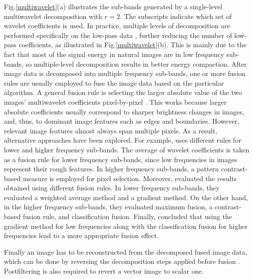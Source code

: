\documentclass{article}
\begin{document}
Fig.\ref{multiwavelet}(a) illustrates the sub-bands generated by a single-level multiwavelet decomposition with $r = 2$. The subscripts indicate which set of wavelet coefficients is used. In practice, multiple levels of decomposition are performed specifically on the low-pass data \cite{Wang2004, Liu2010}, further reducing the number of low-pass coefficients, as illustrated in Fig.\ref{multiwavelet}(b). This is mainly due to the fact that most of the signal energy in natural images are in low frequency sub-bands, so multiple-level decomposition results in better energy compaction.
After image data is decomposed into multiple frequency sub-bands, one or more fusion rules are usually employed to fuse the image data based on the particular algorithm. A general fusion rule is selecting the larger absolute value of the two images' multiwavelet coefficients pixel-by-pixel \cite{Wang2004}. This works because larger absolute coefficients usually correspond to sharper brightness changes in images, and, thus, to dominant image features such as edges and boundaries. However, relevant image features almost always span multiple pixels. As a result, alternative approaches have been explored. For example, \cite{Wang2004} uses different rules for lower and higher frequency sub-bands. The average of wavelet coefficients is taken as a fusion rule for lower frequency sub-bands, since low frequencies in images represent their rough features. In higher frequency sub-bands, a pattern contrast-based measure is employed for pixel selection. Moreover, \cite{Liu2010} evaluated the results obtained using different fusion rules. In lower frequency sub-bands, they evaluated a weighted average method and a gradient method. On the other hand, in the higher frequency sub-bands, they evaluated maximum fusion, a contrast-based fusion rule, and classification fusion. Finally, \cite{Liu2010} concluded that using the gradient method for low frequencies along with the classification fusion for higher frequencies lead to a more appropriate fusion effect.

Finally an image has to be reconstructed from the decomposed fused image data, which can be done by reversing the decomposition steps applied before fusion \cite{Wang2004, Liu2010, Peng2015}. Postfiltering is also required to revert a vector image to scalar one.
\end{document}
